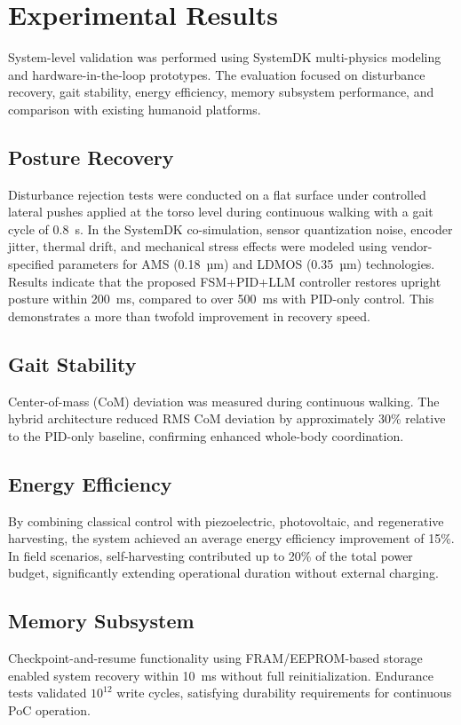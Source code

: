 \section{Experimental Results}
System-level validation was performed using SystemDK multi-physics modeling
and hardware-in-the-loop prototypes. The evaluation focused on disturbance recovery,
gait stability, energy efficiency, memory subsystem performance, and comparison
with existing humanoid platforms.

\subsection{Posture Recovery}
Disturbance rejection tests were conducted on a flat surface under controlled lateral pushes 
applied at the torso level during continuous walking with a gait cycle of 0.8~s. 
In the SystemDK co-simulation, sensor quantization noise, encoder jitter, thermal drift, 
and mechanical stress effects were modeled using vendor-specified parameters 
for AMS (0.18~µm) and LDMOS (0.35~µm) technologies. 
Results indicate that the proposed FSM+PID+LLM controller
restores upright posture within 200~ms,
compared to over 500~ms with PID-only control.
This demonstrates a more than twofold improvement in recovery speed.

\subsection{Gait Stability}
Center-of-mass (CoM) deviation was measured during continuous walking.
The hybrid architecture reduced RMS CoM deviation by approximately 30\%
relative to the PID-only baseline,
confirming enhanced whole-body coordination.

\subsection{Energy Efficiency}
By combining classical control with piezoelectric, photovoltaic, and regenerative harvesting,
the system achieved an average energy efficiency improvement of 15\%.
In field scenarios, self-harvesting contributed up to 20\% of the total power budget,
significantly extending operational duration without external charging.

\subsection{Memory Subsystem}
Checkpoint-and-resume functionality using FRAM/EEPROM-based storage
enabled system recovery within 10~ms without full reinitialization.
Endurance tests validated $10^{12}$ write cycles,
satisfying durability requirements for continuous PoC operation.

